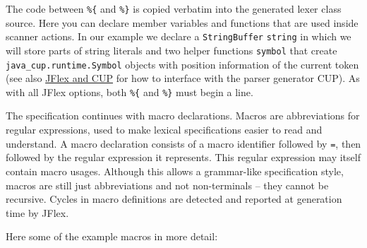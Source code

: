 The code between \texttt{\%\{} and \texttt{\%\}} is copied verbatim into
the generated lexer class source. Here you can declare member variables
and functions that are used inside scanner actions. In our example we
declare a \texttt{StringBuffer} \texttt{string} in which we will store
parts of string literals and two helper functions \texttt{symbol} that
create \texttt{java\_cup.runtime.Symbol} objects with position
information of the current token (see also \hyperref[CUPWork]{JFlex and
CUP} for how to interface with the parser generator CUP). As with all
JFlex options, both \texttt{\%\{} and \texttt{\%\}} must begin a line.

The specification continues with macro declarations. Macros are
abbreviations for regular expressions, used to make lexical
specifications easier to read and understand. A macro declaration
consists of a macro identifier followed by \texttt{=}, then followed by
the regular expression it represents. This regular expression may itself
contain macro usages. Although this allows a grammar-like specification
style, macros are still just abbreviations and not non-terminals -- they
cannot be recursive. Cycles in macro definitions are detected and
reported at generation time by JFlex.

Here some of the example macros in more detail:


